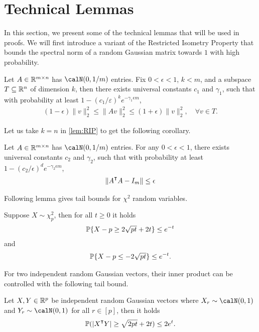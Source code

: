 \section{Technical Lemmas}

In this section, we present some of the technical lemmas that will be used in proofs.
We will first introduce a variant of the Restricted Isometry Property that bounds the spectral norm of a random Gaussian matrix towards $1$ with high probability.

\begin{lemma}\label{lem:RIP}
    Let $A\in {\mathbb{R}^{m\times n}}$ has \iid $\calN(0,1/m)$ entries. Fix $0<\epsilon<1$, $k < m$, and a subspace $T\subseteq \mathbb{R}^n$ of dimension $k$, then there exists universal constants $c_1$ and $\gamma_1$, such that with probability at least $1-(c_1/\varepsilon)^k e^{-\gamma_1\epsilon m}$,
    \begin{align*}
    (1-\epsilon)\|v\|^2_2 \leq \|Av\|^2_2 \leq (1+\epsilon)\|v\|^2_2, \quad \forall v\in T.
    \end{align*}
\end{lemma}
Let us take $k = n$ in \cref{lem:RIP} to get the following corollary.
\begin{corollary}\label{cor:RIP}
    Let $A\in {\mathbb{R}^{m\times n}}$ has \iid $\calN(0,1/m)$ entries. For any $0<\epsilon<1$, there exists universal constants $c_2$ and $\gamma_2$, such that with probability at least $1-(c_2/\epsilon)^d e^{-\gamma_2\epsilon m}$,
    \begin{align*}
        \|A\transpose A - I_m\|\leq \epsilon
    \end{align*}
\end{corollary}

Following lemma gives tail bounds for $\chi^2$ random variables.
\begin{lemma}\label{lem:chi-squared-tail}
    Suppose $X\sim \chi^2_p$, then for all $t\geq 0$ it holds
    \begin{align*}
        \operatorname{\mathbb{P}}\{X-p \geq 2\sqrt{pt} + 2t\} \leq e^{-t}
    \end{align*}
    and
    \begin{align*}
        \operatorname{\mathbb{P}}\{X-p \leq -2\sqrt{pt}\} \leq e^{-t}.
    \end{align*}
\end{lemma}

For two independent random Gaussian vectors, their inner product can be controlled with the following tail bound.
\begin{lemma}\label{lem:inner-product-tail}
    Let $X,Y\in{\mathbb{R}^{p}}$ be independent random Gaussian vectors where $X_r\sim\calN(0,1)$ and $Y_r\sim\calN(0,1)$ for all $r\in[p]$, then it holds
    \begin{align*}
        \prob(|X\transpose Y| \geq \sqrt{2pt} + 2t) \leq 2e^t.
    \end{align*}
\end{lemma}
